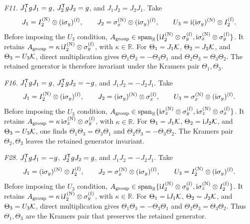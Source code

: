 \begin{samepage}
\medskip\noindent\textit{F11.}\quad
\(J_1^{\mathsf{T}} gJ_1=g\), \(J_2^{\mathsf{T}} gJ_2=g\), and
\(J_1J_2=J_2J_1\).
Take
\begin{equation*}
J_1=I_2^{({\rm N})}\otimes(\mathrm{i}\sigma_y)^{({\rm f})},
\qquad
J_2=\sigma_x^{({\rm N})}\otimes(\mathrm{i}\sigma_y)^{({\rm f})},
\qquad
U_3=\mathrm{i}(\mathrm{i}\sigma_y)^{({\rm N})}\otimes I_2^{({\rm f})}.
\end{equation*}
Before imposing the \(U_3\) condition,
\(A_{\rm group}\in\operatorname{span}_{\mathbb R}
\{\mathrm{i} I_2^{({\rm N})}\otimes\sigma_y^{({\rm f})},
\mathrm{i}\sigma_x^{({\rm N})}\otimes\sigma_y^{({\rm f})}\}\).
It retains
\(A_{\rm group}=\kappa\,\mathrm{i} I_2^{({\rm N})}\otimes\sigma_y^{({\rm f})}\),
with \(\kappa\in\mathbb R\).  For
\(\Theta_1=J_1\mathcal{K}\), \(\Theta_2=J_2\mathcal{K}\), and
\(\Theta_3=U_3\mathcal{K}\), direct multiplication gives
\(\Theta_1\Theta_3=-\Theta_3\Theta_1\) and
\(\Theta_2\Theta_3=\Theta_3\Theta_2\).
The retained generator is therefore invariant under the Kramers pair
\(\Theta_1,\Theta_3\).
\end{samepage}

\medskip\noindent\textit{F16.}\quad
\(J_1^{\mathsf{T}} gJ_1=g\), \(J_2^{\mathsf{T}} gJ_2=-g\), and
\(J_1J_2=-J_2J_1\).
Take
\begin{equation*}
J_1=I_2^{({\rm N})}\otimes(\mathrm{i}\sigma_y)^{({\rm f})},
\qquad
J_2=(\mathrm{i}\sigma_y)^{({\rm N})}\otimes\sigma_x^{({\rm f})},
\qquad
U_3=\sigma_x^{({\rm N})}\otimes(\mathrm{i}\sigma_y)^{({\rm f})}.
\end{equation*}
Before imposing the \(U_3\) condition,
\(A_{\rm group}\in\operatorname{span}_{\mathbb R}
\{\mathrm{i}\sigma_x^{({\rm N})}\otimes\sigma_y^{({\rm f})},
\mathrm{i}\sigma_z^{({\rm N})}\otimes\sigma_x^{({\rm f})}\}\).
It retains
\(A_{\rm group}=\kappa\,\mathrm{i}\sigma_x^{({\rm N})}
\otimes\sigma_y^{({\rm f})}\), with \(\kappa\in\mathbb R\).
For \(\Theta_1=J_1\mathcal{K}\), \(\Theta_2=\mathrm{i} J_2\mathcal{K}\), and
\(\Theta_3=U_3\mathcal{K}\), one finds
\(\Theta_1\Theta_3=\Theta_3\Theta_1\) and
\(\Theta_2\Theta_3=-\Theta_3\Theta_2\).
The Kramers pair \(\Theta_2,\Theta_3\) leaves the retained generator invariant.

\medskip\noindent\textit{F28.}\quad
\(J_1^{\mathsf{T}} gJ_1=-g\), \(J_2^{\mathsf{T}} gJ_2=g\), and
\(J_1J_2=-J_2J_1\).
Take
\begin{equation*}
J_1=(\mathrm{i}\sigma_y)^{({\rm N})}\otimes I_2^{({\rm f})},
\qquad
J_2=\sigma_x^{({\rm N})}\otimes(\mathrm{i}\sigma_y)^{({\rm f})},
\qquad
U_3=I_2^{({\rm N})}\otimes(\mathrm{i}\sigma_y)^{({\rm f})}.
\end{equation*}
Before imposing the \(U_3\) condition,
\(A_{\rm group}\in\operatorname{span}_{\mathbb R}
\{\mathrm{i} I_2^{({\rm N})}\otimes\sigma_y^{({\rm f})},
\mathrm{i}\sigma_z^{({\rm N})}\otimes I_2^{({\rm f})}\}\).
It retains
\(A_{\rm group}=\kappa\,\mathrm{i} I_2^{({\rm N})}\otimes\sigma_y^{({\rm f})}\),
with \(\kappa\in\mathbb R\).  For
\(\Theta_1=\mathrm{i} J_1\mathcal{K}\), \(\Theta_2=J_2\mathcal{K}\), and
\(\Theta_3=U_3\mathcal{K}\), direct multiplication gives
\(\Theta_1\Theta_3=-\Theta_3\Theta_1\) and
\(\Theta_2\Theta_3=\Theta_3\Theta_2\).
Thus \(\Theta_1,\Theta_3\) are the Kramers pair that preserves the retained
generator.

